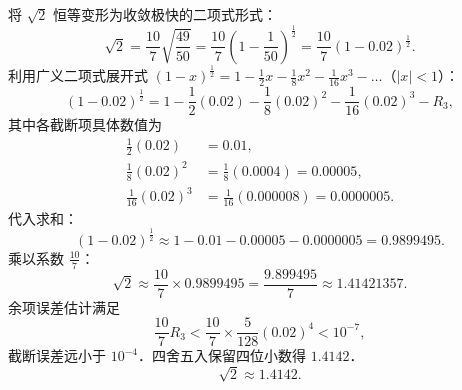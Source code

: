 \begin{solution}
    将 $\sqrt{2}$ 恒等变形为收敛极快的二项式形式：
    \begin{equation}
        \sqrt{2} = \frac{10}{7} \sqrt{\frac{49}{50}} = \frac{10}{7} \left( 1 - \frac{1}{50} \right)^{\frac{1}{2}} = \frac{10}{7} (1 - 0.02)^{\frac{1}{2}}.
    \end{equation}
    利用广义二项式展开式 $(1 - x)^{\frac{1}{2}} = 1 - \frac{1}{2}x - \frac{1}{8}x^2 - \frac{1}{16}x^3 - \dots$（$|x| < 1$）：
    \begin{equation}
        (1 - 0.02)^{\frac{1}{2}} = 1 - \frac{1}{2}(0.02) - \frac{1}{8}(0.02)^2 - \frac{1}{16}(0.02)^3 - R_3,
    \end{equation}
    其中各截断项具体数值为
    \begin{equation}
        \begin{aligned}
            \frac{1}{2}(0.02)    & = 0.01,                               \\
            \frac{1}{8}(0.02)^2  & = \frac{1}{8}(0.0004) = 0.00005,      \\
            \frac{1}{16}(0.02)^3 & = \frac{1}{16}(0.000008) = 0.0000005.
        \end{aligned}
    \end{equation}
    代入求和：
    \begin{equation}
        (1 - 0.02)^{\frac{1}{2}} \approx 1 - 0.01 - 0.00005 - 0.0000005 = 0.9899495.
    \end{equation}
    乘以系数 $\frac{10}{7}$：
    \begin{equation}
        \sqrt{2} \approx \frac{10}{7} \times 0.9899495 = \frac{9.899495}{7} \approx 1.41421357.
    \end{equation}
    余项误差估计满足
    \begin{equation}
        \frac{10}{7} R_3 < \frac{10}{7} \times \frac{5}{128} (0.02)^4 < 10^{-7},
    \end{equation}
    截断误差远小于 $10^{-4}$．四舍五入保留四位小数得 $1.4142$．
    \begin{equation}
        \boxed{\sqrt{2} \approx 1.4142.}
    \end{equation}
\end{solution}

\endinput
